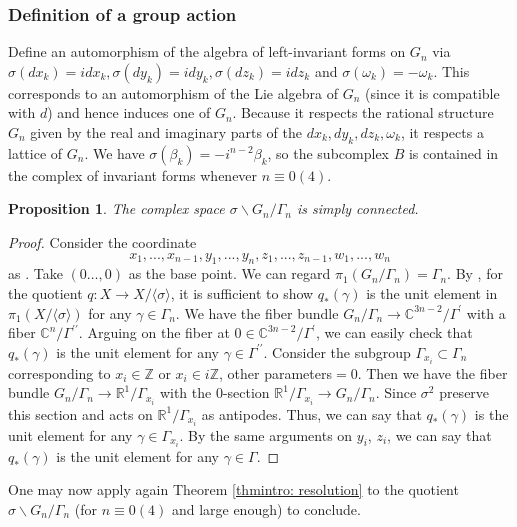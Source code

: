 \documentclass[12pt,reqno]{amsart}
\newtheorem{prop}[thm]{Proposition}
\theoremstyle{definition}
\newcommand{\Z}{\mathbb{Z}}
\newcommand{\R}{\mathbb{R}}
\newcommand{\C}{\mathbb{C}}
\begin{document}
\subsubsection{Definition of a group action}
Define an automorphism of the algebra of left-invariant forms on $G_n$ via $\sigma(dx_k)=idx_k,\sigma(dy_k)=idy_k, \sigma(dz_k)=idz_k$ and $\sigma(\omega_k)=-\omega_k$. This corresponds to an automorphism of the Lie algebra of $G_n$ (since it is compatible with $d$) and hence induces one of $G_n$. Because it respects the rational structure $G_n$ given by the real and imaginary parts of the $dx_k,dy_k,dz_k,\omega_k$, it respects a lattice of $G_n$. We have $\sigma(\beta_k)=-i^{n-2}\beta_k$, so the subcomplex $B$ is contained in the complex of invariant forms whenever $n\equiv 0(4)$. 

\begin{prop}
 The complex space $\sigma\backslash G_n/\Gamma_n$ is simply connected.
\end{prop}
\begin{proof}
Consider the coordinate
\[
x_1,...,x_{n-1},y_1,...,y_{n},z_1,...,z_{n-1}, w_1,...,w_n
\]
as \cite{BR14}.
Take $(0\dots,0)$ as the base point.
We can regard $\pi_{1} (G_n/\Gamma_n)=\Gamma_{n}$. By \cite[Corollary 6.3]{Bre}, for the quotient $q:X\to X /\langle\sigma \rangle$, it is sufficient to show $q_{*}(\gamma)$ is the unit element in $\pi_{1}(X/\langle\sigma \rangle)$ for any $\gamma\in \Gamma_n$. We have the fiber bundle  $ G_n/\Gamma_n\to \C^{3n-2}/\Gamma^{\prime}$ with a fiber $\C^{n}/\Gamma^{\prime\prime}$. Arguing on the fiber at $0\in \C^{3n-2}/\Gamma^{\prime}$, we can easily check that $q_{*}(\gamma)$ is the unit element for any $\gamma\in \Gamma^{\prime\prime}$. Consider the subgroup $\Gamma_{x_{i}}\subset \Gamma_{n}$ corresponding to $x_{i}\in \Z$ or $x_{i}\in i\Z$, other parameters$=0$.
Then we have the fiber bundle $ G_n/\Gamma_n\to \R^{1}/\Gamma_{x_{i}}$ with the $0$-section $\R^{1}/\Gamma_{x_{i}}\to G_n/\Gamma_n$.
Since $\sigma^2$ preserve this section and acts on $\R^{1}/\Gamma_{x_{i}}$ as antipodes.
Thus, we can say that 
$q_{*}(\gamma)$ is the unit element for any $\gamma\in \Gamma_{x_{i}}$.
By the same arguments on $y_{i}$, $z_{i}$, we can say that $q_{*}(\gamma)$ is the unit element for any $\gamma\in \Gamma$.\end{proof}

One may now apply again Theorem \ref{thmintro: resolution} to the quotient $\sigma\backslash G_n/\Gamma_n$ (for $n\equiv 0(4)$ and large enough) to conclude. 
\end{document}
